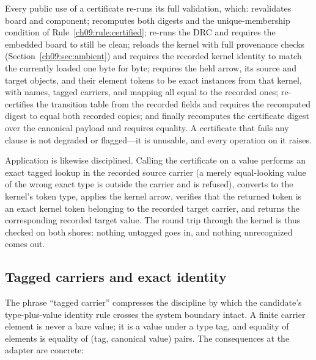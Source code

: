 \begin{invariant}\label{ch09:inv:revalidate}
Every public use of a certificate re-runs its full validation, which: revalidates board and component; recomputes both digests and the unique-membership condition of Rule~\ref{ch09:rule:certified}; re-runs the DRC and requires the embedded board to still be clean; reloads the kernel with full provenance checks (Section~\ref{ch09:sec:ambient}) and requires the recorded kernel identity to match the currently loaded one byte for byte; requires the held arrow, its source and target objects, and their element tokens to be exact instances from that kernel, with names, tagged carriers, and mapping all equal to the recorded ones; re-certifies the transition table from the recorded fields and requires the recomputed digest to equal both recorded copies; and finally recomputes the certificate digest over the canonical payload and requires equality. A certificate that fails any clause is not degraded or flagged---it is unusable, and every operation on it raises.
\end{invariant}

Application is likewise disciplined. Calling the certificate on a value performs an exact tagged lookup in the recorded source carrier (a merely equal-looking value of the wrong exact type is outside the carrier and is refused), converts to the kernel's token type, applies the kernel arrow, verifies that the returned token is an exact kernel token belonging to the recorded target carrier, and returns the corresponding recorded target value. The round trip through the kernel is thus checked on both shores: nothing untagged goes in, and nothing unrecognized comes out.

\subsection{Tagged carriers and exact identity}\label{ch09:sub:tagged}

The phrase ``tagged carrier'' compresses the discipline by which the candidate's type-plus-value identity rule crosses the system boundary intact. A finite carrier element is never a bare value; it is a value under a type tag, and equality of elements is equality of (tag, canonical value) pairs. The consequences at the adapter are concrete:

